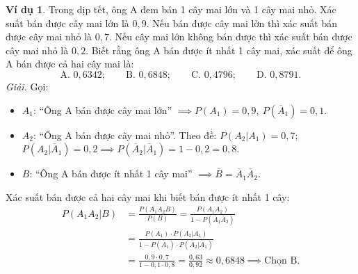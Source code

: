 \documentclass[12pt,a4paper]{article}
\theoremstyle{definition}
\newtheorem{vidu}{Ví dụ}[section]
\begin{document}
\begin{vidu}
Trong dịp tết, ông A đem bán 1 cây mai lớn và 1 cây mai nhỏ. Xác suất bán được cây mai lớn là $0{,}9$. Nếu bán được cây mai lớn thì xác suất bán được cây mai nhỏ là $0{,}7$. Nếu cây mai lớn không bán được thì xác suất bán được cây mai nhỏ là $0{,}2$. Biết rằng ông A bán được ít nhất 1 cây mai, xác suất để ông A bán được cả hai cây mai là:
\[
\text{A. } 0{,}6342; \qquad \text{B. } 0{,}6848; \qquad \text{C. } 0{,}4796; \qquad \text{D. } 0{,}8791.
\]
\textit{Giải.} Gọi:
\begin{itemize}
    \item $A_1$: ``Ông A bán được cây mai lớn'' $\implies P(A_1) = 0{,}9,\ P(\overline{A}_1) = 0{,}1$.
    \item $A_2$: ``Ông A bán được cây mai nhỏ''.
    Theo đề: $P(A_2 | A_1) = 0{,}7$; $P(A_2 | \overline{A}_1) = 0{,}2 \implies P(\overline{A}_2 | \overline{A}_1) = 1 - 0{,}2 = 0{,}8$.
    \item $B$: ``Ông A bán được ít nhất 1 cây mai'' $\implies \overline{B} = \overline{A}_1 \overline{A}_2$.
\end{itemize}
Xác suất bán được cả hai cây mai khi biết bán được ít nhất 1 cây:
\begin{align*}
P(A_1 A_2 | B) &= \frac{P(A_1 A_2 B)}{P(B)} = \frac{P(A_1 A_2)}{1 - P(\overline{A}_1 \overline{A}_2)} \\
               &= \frac{P(A_1) \cdot P(A_2 | A_1)}{1 - P(\overline{A}_1) \cdot P(\overline{A}_2 | \overline{A}_1)} \\
               &= \frac{0{,}9 \cdot 0{,}7}{1 - 0{,}1 \cdot 0{,}8} = \frac{0{,}63}{0{,}92} \approx 0{,}6848 \implies \text{Chọn B.}
\end{align*}
\end{vidu}
\end{document}
